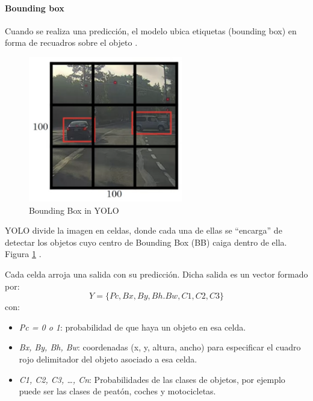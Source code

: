 \paragraph{Bounding box}
Cuando se realiza una predicción, el modelo ubica etiquetas (bounding box) en forma de recuadros sobre el objeto \cite{cnncourse}.

\begin{figure}[h!]
    \centering
    \includegraphics[width=0.6\textwidth]{img/bounding-box-yolo.png}
    \caption{Bounding Box in YOLO}
    \label{fig:bb in YOLO}
\end{figure}

YOLO divide la imagen en celdas, donde cada una de ellas se “encarga” de detectar los objetos cuyo centro de Bounding Box (BB) caiga dentro de ella. Figura \ref{fig:bb in YOLO} .

Cada celda arroja una salida con su predicción.
Dicha salida es un vector formado por: \[Y=\{Pc, Bx, By, Bh. Bw, C1, C2, C3\}\] con:
\begin{itemize}
    \item \textit{Pc = 0 o 1}: probabilidad de que haya un objeto en esa celda.
    \item \textit{Bx, By, Bh, Bw}: coordenadas (x, y, altura, ancho) para especificar el cuadro rojo delimitador del objeto asociado a esa celda.
    \item \textit{C1, C2, C3, …, Cn}: Probabilidades de las clases de objetos, por ejemplo puede ser las clases de peatón, coches y motocicletas.
\end{itemize}

